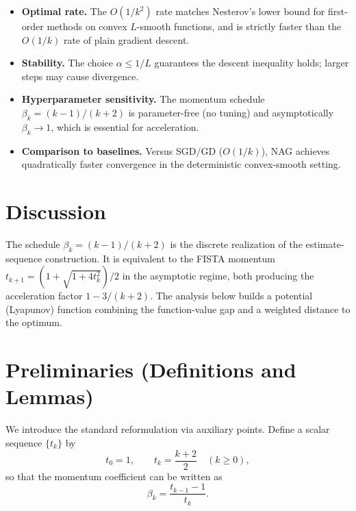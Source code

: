\documentclass{article}
\begin{document}
\begin{itemize}
\item \textbf{Optimal rate.} The $O(1/k^2)$ rate matches Nesterov's lower bound
      for first-order methods on convex $L$-smooth functions, and is strictly
      faster than the $O(1/k)$ rate of plain gradient descent.
\item \textbf{Stability.} The choice $\alpha \le 1/L$ guarantees the descent
      inequality holds; larger steps may cause divergence.
\item \textbf{Hyperparameter sensitivity.} The momentum schedule
      $\beta_k = (k-1)/(k+2)$ is parameter-free (no tuning) and asymptotically
      $\beta_k \to 1$, which is essential for acceleration.
\item \textbf{Comparison to baselines.} Versus SGD/GD ($O(1/k)$), NAG achieves
      quadratically faster convergence in the deterministic convex-smooth setting.
\end{itemize}

\section*{Discussion}

The schedule $\beta_k = (k-1)/(k+2)$ is the discrete realization of the
estimate-sequence construction. It is equivalent to the FISTA momentum
$t_{k+1} = (1+\sqrt{1+4t_k^2})/2$ in the asymptotic regime, both producing the
acceleration factor $1 - 3/(k+2)$. The analysis below builds a potential
(Lyapunov) function combining the function-value gap and a weighted distance to
the optimum.

\section*{Preliminaries (Definitions and Lemmas)}

We introduce the standard reformulation via auxiliary points. Define a scalar
sequence $\{t_k\}$ by
\begin{equation}
t_0 = 1, \qquad t_{k} = \frac{k+2}{2} \quad (k \ge 0), \label{eq:tk}
\end{equation}
so that the momentum coefficient can be written as
\begin{equation}
\beta_k = \frac{t_{k-1}-1}{t_k}. \label{eq:betatk}
\end{equation}
\end{document}
